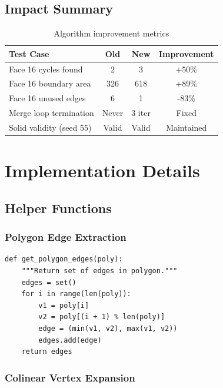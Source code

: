 \documentclass[11pt]{article}
\begin{document}
\subsection{Impact Summary}

\begin{table}[h]
\centering
\begin{tabular}{|l|c|c|c|}
\hline
\textbf{Test Case} & \textbf{Old} & \textbf{New} & \textbf{Improvement} \\ \hline
Face 16 cycles found & 2 & 3 & +50\% \\ \hline
Face 16 boundary area & 326 & 618 & +89\% \\ \hline
Face 16 unused edges & 6 & 1 & -83\% \\ \hline
Merge loop termination & Never & 3 iter & Fixed \\ \hline
Solid validity (seed 55) & Valid & Valid & Maintained \\ \hline
\end{tabular}
\caption{Algorithm improvement metrics}
\end{table}

\section{Implementation Details}

\subsection{Helper Functions}

\subsubsection{Polygon Edge Extraction}

\begin{lstlisting}[caption={Get ordered edges from polygon},label={lst:getedges}]
def get_polygon_edges(poly):
    """Return set of edges in polygon."""
    edges = set()
    for i in range(len(poly)):
        v1 = poly[i]
        v2 = poly[(i + 1) % len(poly)]
        edge = (min(v1, v2), max(v1, v2))
        edges.add(edge)
    return edges
\end{lstlisting}

\subsubsection{Colinear Vertex Expansion}
\end{document}

